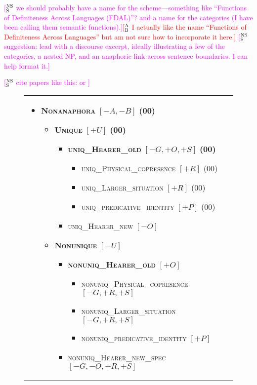 \documentclass[11pt,letterpaper]{article}
\newcommand{\ensuretext}[1]{#1}
\newcommand{\nssmarker}{\ensuretext{\textcolor{magenta}{\ensuremath{^{\textsc{NS}}_{\textsc{S}}}}}}
\newcommand{\abmarker}{\ensuretext{\textcolor{red}{\ensuremath{^{\textsc{A}}_{\textsc{B}}}}}}
\newcommand{\arkcomment}[3]{\ensuretext{\textcolor{#3}{[#1 #2]}}}
\newcommand{\nss}[1]{\arkcomment{\nssmarker}{#1}{magenta}}
\newcommand{\ab}[1]{\arkcomment{\abmarker}{#1}{red}}
\newcommand{\ilbl}[1]{\mbox{\textbf{\textsc{#1}}}} %
\newcommand{\llbl}[1]{\mbox{\textsc{#1}}} %
\begin{document}
 
\nss{we should probably have a name for the scheme---something like ``Functions of Definiteness Across Languages (FDAL)''? and a name for the categories (I have been calling them semantic functions).}\ab{I actually like the name ``Functions of Definiteness Across Languages'' but am not sure how to incorporate it here.}
\nss{suggestion: lead with a discourse excerpt, ideally illustrating a few of the categories, a nested NP, and 
an anaphoric link across sentence boundaries. I can help format it.}

\nss{cite papers like this: \citet{bhatia-14} or \citep{reiter-10}}

\begin{figure*}\small
\begin{tabular}{p{}p{}}
\begin{itemize}
\item    \ilbl{Nonanaphora} $[-A,-B]$ \textbf{(00)}
  \begin{itemize}
  \item      \ilbl{Unique} $[+U]$ \textbf{(00)}
    \begin{itemize}
    \item        \ilbl{uniq\_Hearer\_old} $[-G,+O,+S]$ \textbf{(00)}
      \begin{itemize}
      \item          \llbl{uniq\_Physical\_copresence} $[+R]$ (00)
      \item          \llbl{uniq\_Larger\_situation} $[+R]$ (00)
      \item          \llbl{uniq\_predicative\_identity} $[+P]$ (00)
      \end{itemize}
    \item        \llbl{uniq\_Hearer\_new} $[-O]$
    \end{itemize}
   \item     \ilbl{Nonunique} $[-U]$
     \begin{itemize}
     \item       \ilbl{nonuniq\_Hearer\_old} $[+O]$
       \begin{itemize}
       \item         \llbl{nonuniq\_Physical\_copresence} $[-G,+R,+S]$
       \item         \llbl{nonuniq\_Larger\_situation} $[-G,+R,+S]$
       \item         \llbl{nonuniq\_predicative\_identity} $[+P]$
       \end{itemize}
     \item       \llbl{nonuniq\_Hearer\_new\_spec} $[-G,-O,+R,+S]$

\end{itemize}
\end{itemize}
\end{itemize}
\end{tabular}
\end{figure*}
\end{document}
